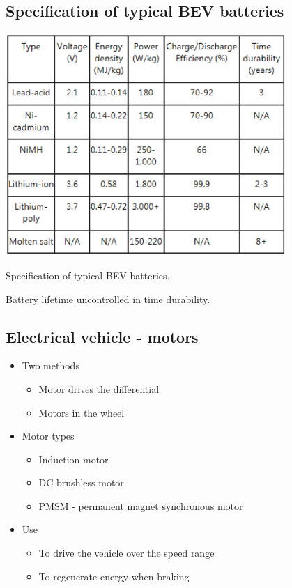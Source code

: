\subsection{Specification of typical BEV batteries}
\begin{table}[H]
    \centering
    \includegraphics[width = 0.8\textwidth]{img/figure110.png}
    \caption{Specification of typical BEV batteries.}
\end{table}
Battery lifetime uncontrolled in time durability.
\subsection{Electrical vehicle - motors}
\begin{itemize}
    \item Two methods
          \begin{itemize}
              \item Motor drives the differential
              \item Motors in the wheel
          \end{itemize}
    \item Motor types
          \begin{itemize}
              \item Induction motor
              \item DC brushless motor
              \item PMSM - permanent magnet synchronous motor
          \end{itemize}
    \item Use
          \begin{itemize}
              \item To drive the vehicle over the speed range
              \item To regenerate energy when braking
          \end{itemize}
\end{itemize}
